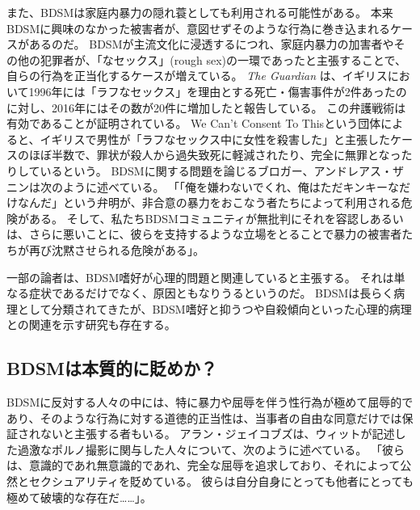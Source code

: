 \documentclass[paper=a4,book,openany]{jlreq} \usepackage{mystyle}
\begin{document}
また、BDSMは家庭内暴力の隠れ蓑としても利用される可能性がある。
本来BDSMに興味のなかった被害者が、意図せずそのような行為に巻き込まれるケースがあるのだ。
BDSMが主流文化に浸透するにつれ、家庭内暴力の加害者やその他の犯罪者が、「なセックス」(rough sex)の一環であったと主張することで、自らの行為を正当化するケースが増えている。
\emph{The Guardian} は、イギリスにおいて1996年には「ラフなセックス」を理由とする死亡・傷害事件が2件あったのに対し、2016年にはその数が20件に増加したと報告している\citep{grierson20:_gover_consid_law_curb_use}。
この弁護戦術は有効であることが証明されている。
We Can't Consent To Thisという団体によると、イギリスで男性が「ラフなセックス中に女性を殺害した」と主張したケースのほぼ半数で、罪状が殺人から過失致死に軽減されたり、完全に無罪となったりしているという\citep{harman20:_rough_sex_gone_wrong_defen,woodyatt20:_grace_millan_rise_shades_defen_murder_trial}。
BDSMに関する問題を論じるブロガー、アンドレアス・ザニンは次のように述べている。
「「俺を嫌わないでくれ、俺はただキンキーなだけなんだ」という弁明が、非合意の暴力をおこなう者たちによって利用される危険がある。
そして、私たちBDSMコミュニティが無批判にそれを容認し{\DDASH}あるいは、さらに悪いことに、彼らを支持するような立場をとることで{\DDASH}暴力の被害者たちが再び沈黙させられる危険がある」\citep{zanin14:_poor_persec_perver}。

一部の論者は、BDSM嗜好が心理的問題と関連していると主張する。
それは単なる症状であるだけでなく、原因ともなりうるというのだ。
BDSMは長らく病理として分類されてきたが、BDSM嗜好と抑うつや自殺傾向といった心理的病理との関連を示す研究も存在する\citep{brown17:_suicid_risk_bdsm_pract}。

\subsection{BDSMは本質的に貶めか？}

BDSMに反対する人々の中には、特に暴力や屈辱を伴う性行為が極めて屈辱的であり、そのような行為に対する道徳的正当性は、当事者の自由な同意だけでは保証されないと主張する者もいる。
アラン・ジェイコブズは、ウィットが記述した過激なポルノ撮影に関与した人々について、次のように述べている。
「彼らは、意識的であれ無意識的であれ、完全な屈辱を追求しており、それによって公然とセクシュアリティを貶めている。
彼らは自分自身にとっても他者にとっても極めて破壊的な存在だ……」\citep{jacobs03:_in_which_noah_millm_i}。
\end{document}
